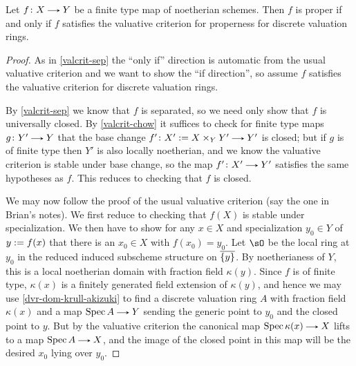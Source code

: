 \begin{nothing}
  \begin{subproposition}
    \label{valcrit-proper}
    Let $f \c X \to Y$ be a finite type map of noetherian schemes. Then $f$ is proper if and only if $f$ satisfies the valuative criterion for properness for discrete valuation rings.

    \begin{proof}
      As in \cref{valcrit-sep} the ``only if'' direction is automatic from the usual valuative criterion and we want to show the ``if direction'', so assume $f$ satisfies the valuative criterion for discrete valuation rings.

      By \cref{valcrit-sep} we know that $f$ is separated, so we need only show that $f$ is universally closed. By \cref{valcrit-chow} it suffices to check for finite type maps $g \c Y' \to Y$ that the base change $f' \c X' \ce X \times_Y Y' \to Y'$ is closed; but if $g$ is of finite type then $Y'$ is also locally noetherian, and we know the valuative criterion is stable under base change, so the map $f' \c X' \to Y'$ satisfies the same hypotheses as $f$. This reduces to checking that $f$ is closed.

      We may now follow the proof of the usual valuative criterion (say the one in Brian's notes). We first reduce to checking that $f(X)$ is stable under specialization. We then have to show for any $x \in X$ and specialization $y_0 \in Y$ of $y \mathrel{:=} f(x)$ that there is an $x_0 \in X$ with $f(x_0) = y_0$. Let $\sO$ be the local ring at $y_0$ in the reduced induced subscheme structure on $\overline{\{y\}}$. By noetherianess of $Y$, this is a local noetherian domain with fraction field $\kappa(y)$. Since $f$ is of finite type, $\kappa(x)$ is a finitely generated field extension of $\kappa(y)$, and hence we may use \cref{dvr-dom-krull-akizuki} to find a discrete valuation ring $A$ with fraction field $\kappa(x)$ and a map $\Spec A \to Y$ sending the generic point to $y_0$ and the closed point to $y$. But by the valuative criterion the canonical map $\Spec \kappa(x) \to X$ lifts to a map $\Spec A \to X$, and the image of the closed point in this map will be the desired $x_0$ lying over $y_0$.
    \end{proof}
  \end{subproposition}
\end{nothing}





